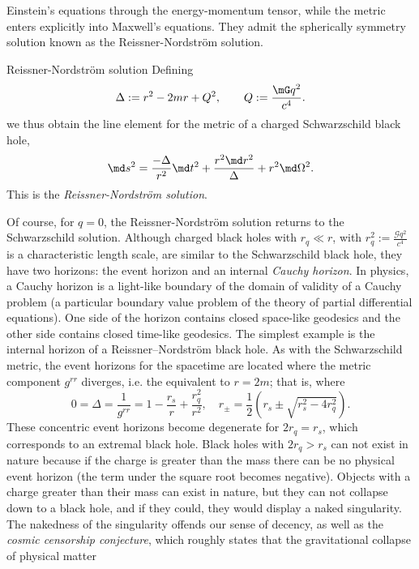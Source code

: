 Einstein’s equations through the energy-momentum tensor, while the metric enters explicitly
into Maxwell’s equations. They admit the spherically symmetry solution known as the Reissner-Nordström solution.
\begin{mybox}{Reissner-Nordström solution}
	Defining
	\begin{equation}
		\Delta := r^2 -2mr + Q^2, \qquad Q:= \frac{\mG q^2}{c^4}.
	\end{equation}
	we thus obtain the line element for the metric of a charged Schwarzschild black hole,
	\begin{equation}
		\md s^2 = \frac{- \Delta}{r^2} \md t^2 + \frac{r^2 \md r^2}{\Delta} + r^2 \md \Omega^2.
	\end{equation}
	This is the \emph{Reissner-Nordström solution}.
\end{mybox}
Of course, for $q = 0$, the Reissner-Nordström solution returns to the
Schwarzschild solution.
Although charged black holes with $r_q \ll  r$, with $r^2_q := \frac{\mathcal{G} q^2}{c^4}$ is a characteristic length scale, are similar to the Schwarzschild black hole, they have two horizons: the event horizon and an internal \emph{Cauchy horizon}. In physics, a Cauchy horizon is a light-like boundary of the domain of validity of a Cauchy problem (a particular boundary value problem of the theory of partial differential equations). One side of the horizon contains closed space-like geodesics and the other side contains closed time-like geodesics. The simplest example is the internal horizon of a Reissner–Nordström black hole. As with the Schwarzschild metric, the event horizons for the spacetime are located where the metric component $g^{rr}$ diverges, i.e. the equivalent to $r=2m$; that is, where
\begin{equation}
	0 =  \Delta= \frac{1}{g^{rr}} = 1- \frac{r_s}{r} + \frac{r^2_q}{r^2}, \quad r_{\pm} = \frac{1}{2} \left( r_s \pm   \sqrt{r^2_s - 4r^2_q}\right).
\end{equation}
These concentric event horizons become degenerate for $2 r_q = r_s$, which corresponds to an extremal black hole. Black holes with $2r_q > r_s$ can not exist in nature because if the charge is greater than the mass there can be no physical event horizon (the term under the square root becomes negative). Objects with a charge greater than their mass can exist in nature, but they can not collapse down to a black hole, and if they could, they would display a naked singularity. The nakedness of the singularity offends our sense of decency, as well as the \emph{cosmic censorship conjecture}, which roughly states that the gravitational collapse of physical matter
